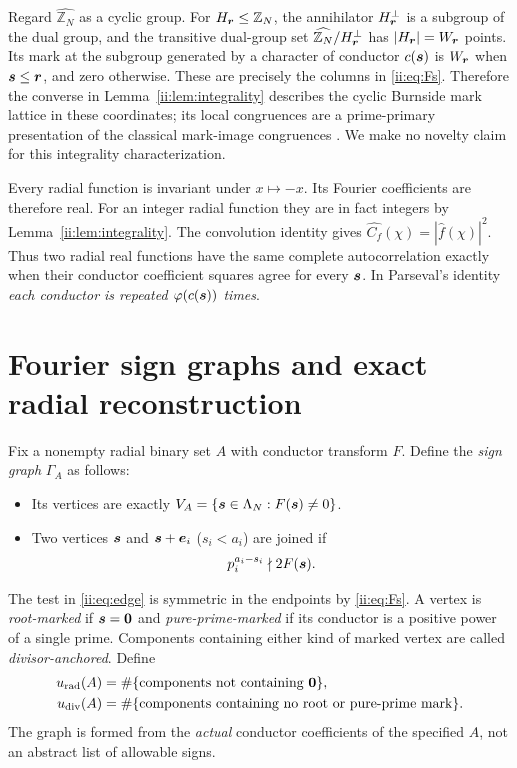 \begin{remark}\label{ii:rem:burnside}
Regard $\widehat{\mathbb Z_N}$ as a cyclic group.  For $H_{\boldsymbol{r}}\le\mathbb Z_N$, the annihilator $H_{\boldsymbol{r}}^{\perp}$ is a subgroup of the dual group, and the transitive dual-group set $\widehat{\mathbb Z_N}/H_{\boldsymbol{r}}^{\perp}$ has $|H_{\boldsymbol{r}}|=W_{\boldsymbol{r}}$ points.  Its mark at the subgroup generated by a character of conductor $c(\boldsymbol{s})$ is $W_{\boldsymbol{r}}$ when $\boldsymbol{s}\le\boldsymbol{r}$, and zero otherwise.  These are precisely the columns in \eqref{ii:eq:Fs}.  Therefore the converse in Lemma~\ref{ii:lem:integrality} describes the cyclic Burnside mark lattice in these coordinates; its local congruences are a prime-primary presentation of the classical mark-image congruences \cite{tomDieck1979,BoltjePfeiffer2008}.  We make no novelty claim for this integrality characterization.
\end{remark}

\begin{remark}\label{ii:rem:fourier}
Every radial function is invariant under $x\mapsto-x$.  Its Fourier coefficients are therefore real.  For an integer radial function they are in fact integers by Lemma~\ref{ii:lem:integrality}.  The convolution identity gives $\widehat{C_f}(\chi)=|\widehat f(\chi)|^2$.  Thus two radial real functions have the same complete autocorrelation exactly when their conductor coefficient squares agree for every $\boldsymbol{s}$.  In Parseval's identity \emph{each conductor is repeated $\varphi(c(\boldsymbol{s}))$ times}.
\end{remark}

\section{Fourier sign graphs and exact radial reconstruction}
Fix a nonempty radial binary set $A$ with conductor transform $F$.  Define the \emph{sign graph} $\Gamma_A$ as follows:
\begin{itemize}[nosep]
 \item Its vertices are exactly $V_A=\{\boldsymbol{s}\in\Lambda_N:F(\boldsymbol{s})\ne0\}$.
 \item Two vertices $\boldsymbol{s}$ and $\boldsymbol{s}+\boldsymbol{e}_i$ ($s_i<a_i$) are joined if
 \begin{equation}\label{ii:eq:edge}
 p_i^{a_i-s_i}\nmid 2F(\boldsymbol{s}).
 \end{equation}
\end{itemize}
The test in \eqref{ii:eq:edge} is symmetric in the endpoints by \eqref{ii:eq:Fs}.  A vertex is \emph{root-marked} if $\boldsymbol{s}=\boldsymbol0$ and \emph{pure-prime-marked} if its conductor is a positive power of a single prime.  Components containing either kind of marked vertex are called \emph{divisor-anchored}.  Define
\begin{align*}
 u_{\rm rad}(A)&=\#\{\text{components not containing }\boldsymbol0\},\\
 u_{\rm div}(A)&=\#\{\text{components containing no root or pure-prime mark}\}.
\end{align*}
The graph is formed from the \emph{actual} conductor coefficients of the specified $A$, not an abstract list of allowable signs.

